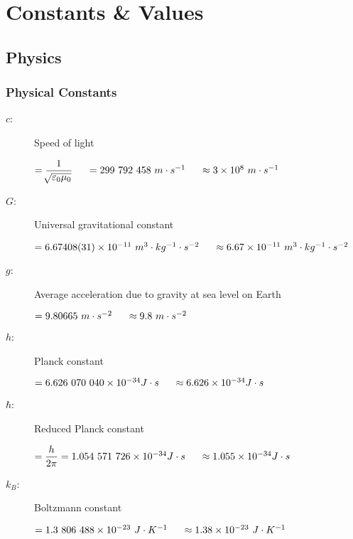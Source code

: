 \chapter{Constants \& Values}

\section{Physics}


\subsection{Physical Constants}	
\begin{description}

\item[$c$:] Speed of light
\begin{itemize}
\items $ = \dfrac{1}{\sqrt[]{\varepsilon_0 \mu_0}} \tab[0.5cm] = 299\ 792\ 458\ m\cdot s^{-1} \tab[0.5cm]\approx 3 \times 10^{8} \ m\cdot s^{-1}$
\end{itemize}			

\item[$G$:] Universal gravitational constant
\begin{itemize}
\items $ = 6.67408(31) \times 10^{-11} \ m^3\cdot kg^{-1}\cdot s^{-2} \tab[0.5cm]\approx 6.67 \times 10^{-11} \ m^3\cdot kg^{-1}\cdot s^{-2}$
\end{itemize}			

\item[$g$:] Average acceleration due to gravity at sea level on Earth
\begin{itemize}
\items $ = 9.80665 \ m \cdot s^{-2} \tab[0.5cm]\approx 9.8 \ m \cdot s^{-2}$
\end{itemize}			

\item[$h$:] Planck constant
\begin{itemize}
\items $ = 6.626\ 070\ 040\times 10^{-34} J\cdot s \tab[0.5cm]\approx 6.626\times 10^{-34} J\cdot s  $
\end{itemize}			

\item[$\hbar$:] Reduced Planck constant
\begin{itemize}
\items $ = \dfrac{h}{2\pi} = 1.054\ 571\ 726\times 10^{-34} J\cdot s \tab[0.5cm]\approx 1.055\times 10^{-34} J\cdot s  $
\end{itemize}			

\item[$k_B$:] Boltzmann constant
\begin{itemize}
\items $ = 1.3\ 806\ 488\times 10^{-23} \ J\cdot K^{-1} \tab[0.5cm] \approx 1.38\times 10^{-23}\ J\cdot K^{-1}$
\end{itemize}			


\end{description}
